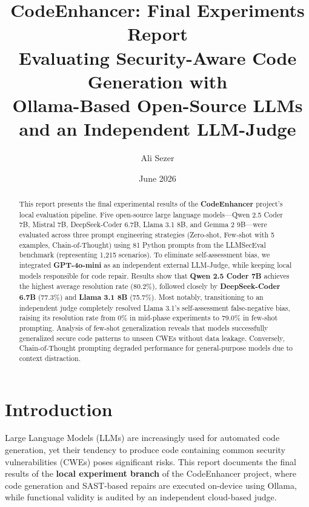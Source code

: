 \documentclass[12pt,a4paper]{article}
\title{%
  \textbf{CodeEnhancer: Final Experiments Report} \\[6pt]
  \large Evaluating Security-Aware Code Generation with \\
  Ollama-Based Open-Source LLMs and an Independent LLM-Judge
}
\author{Ali Sezer}
\date{June 2026}
\begin{document}
\maketitle

\begin{abstract}
This report presents the final experimental results of the \textbf{CodeEnhancer} project's local evaluation pipeline. Five open-source large language models---Qwen 2.5 Coder 7B, Mistral 7B, DeepSeek-Coder 6.7B, Llama 3.1 8B, and Gemma 2 9B---were evaluated across three prompt engineering strategies (Zero-shot, Few-shot with 5 examples, Chain-of-Thought) using 81 Python prompts from the LLMSecEval benchmark (representing 1,215 scenarios). To eliminate self-assessment bias, we integrated \textbf{GPT-4o-mini} as an independent external LLM-Judge, while keeping local models responsible for code repair. Results show that \textbf{Qwen 2.5 Coder 7B} achieves the highest average resolution rate (80.2\%), followed closely by \textbf{DeepSeek-Coder 6.7B} (77.3\%) and \textbf{Llama 3.1 8B} (75.7\%). Most notably, transitioning to an independent judge completely resolved Llama 3.1's self-assessment false-negative bias, raising its resolution rate from 0\% in mid-phase experiments to 79.0\% in few-shot prompting. Analysis of few-shot generalization reveals that models successfully generalized secure code patterns to unseen CWEs without data leakage. Conversely, Chain-of-Thought prompting degraded performance for general-purpose models due to context distraction.
\end{abstract}

\section{Introduction}
\label{sec:intro}

Large Language Models (LLMs) are increasingly used for automated code generation, yet their tendency to produce code containing common security vulnerabilities (CWEs) poses significant risks. This report documents the final results of the \textbf{local experiment branch} of the CodeEnhancer project, where code generation and SAST-based repairs are executed on-device using Ollama, while functional validity is audited by an independent cloud-based judge. 
\end{document}

